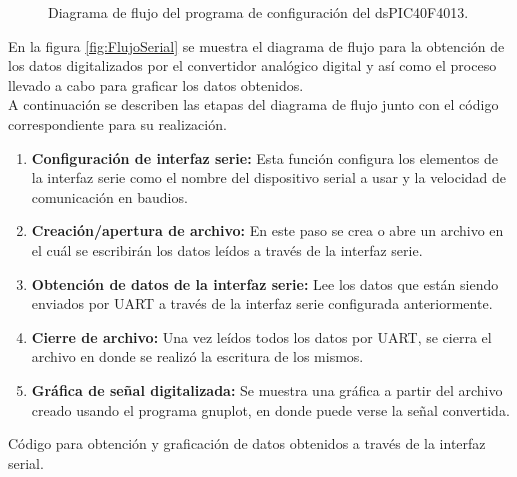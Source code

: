 	\begin{figure}[htbp!]
		\centering
		\caption{Diagrama de flujo del programa de configuración del dsPIC40F4013.}
		\label{fig:ConfiguracionMicro}
	\end{figure}
\pagebreak
En la figura \ref{fig:FlujoSerial} se muestra el diagrama de flujo para la obtención de los datos digitalizados por el convertidor analógico digital y así como el proceso llevado a cabo para graficar los datos obtenidos.\\

A continuación se describen las etapas del diagrama de flujo junto con el código correspondiente para su realización.

\begin{enumerate}
	\item \textbf{Configuración de interfaz serie:} Esta función configura los elementos de la interfaz serie como el nombre del dispositivo serial a usar y la velocidad de comunicación en baudios.
	\item \textbf{Creación/apertura de archivo:} En este paso se crea o abre un archivo en el cuál se escribirán los datos leídos a través de la interfaz serie.
	\item \textbf{Obtención de datos de la interfaz serie:} Lee los datos que están siendo enviados por UART a través de la interfaz serie configurada anteriormente.
	\item \textbf{Cierre de archivo:} Una vez leídos todos los datos por UART, se cierra el archivo en donde se realizó la escritura de los mismos.
	\item \textbf{Gráfica de señal digitalizada:} Se muestra una gráfica a partir del archivo creado usando el programa gnuplot, en donde puede verse la señal convertida.
\end{enumerate}
\pagebreak
\lstset{language=c}
Código para obtención y graficación de datos obtenidos a través de la interfaz serial.

